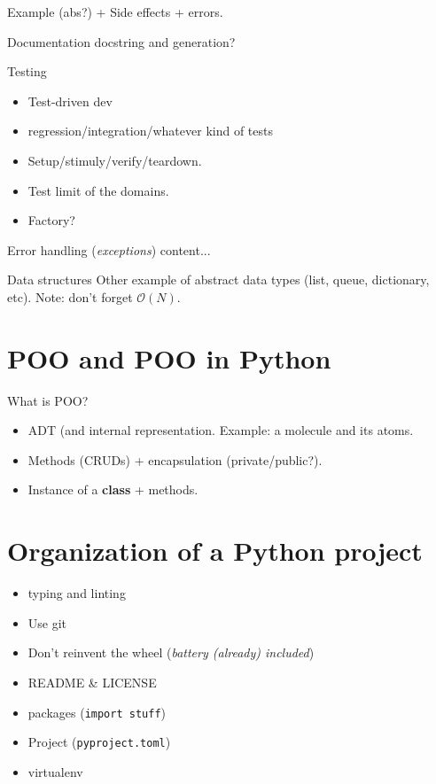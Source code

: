 \documentclass[10pt,
aspectratio=169
]{beamer}
\begin{document}
\begin{frame}
	Example (abs?) + Side effects + errors.
\end{frame}

\begin{frame}{Documentation}
	docstring and generation?
\end{frame}

\begin{frame}{Testing}
	\begin{itemize}
		\item Test-driven dev
		\item regression/integration/whatever kind of tests
		\item Setup/stimuly/verify/teardown.
		\item Test limit of the domains.
		\item Factory?
	\end{itemize}
\end{frame}

\begin{frame}{Error handling (\textit{exceptions})}
	content...
\end{frame}

\begin{frame}{Data structures}
Other example of abstract data types (list, queue, dictionary, etc).
Note: don't forget $\mathcal O(N)$.
\end{frame}

 \section{POO and POO in Python}
 
 \begin{frame}{What is POO?}
 	\begin{itemize}
 		\item ADT (and internal representation. Example: a molecule and its atoms.
 		\item Methods (CRUDs)  + encapsulation (private/public?).
 		\item Instance of a \textbf{class} + methods.
 	\end{itemize}
 \end{frame}
 
 \section{Organization of a Python project}
 
 \begin{frame}
 	\begin{itemize}
 		\item typing and linting
 		\item Use git
 		\item Don't reinvent the wheel (\textit{battery (already) included})
 		\item README \& LICENSE
 		\item packages (\texttt{import stuff})
 		\item Project (\texttt{pyproject.toml})
 		\item virtualenv
 	\end{itemize}
 \end{frame}
\end{document}
